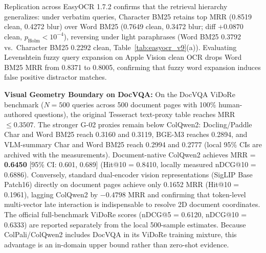 Replication across EasyOCR 1.7.2 \cite{jaidedai2020easyocr} confirms that the retrieval hierarchy generalizes: under verbatim queries, Character BM25 retains top MRR (0.8519 clean, 0.4272 blur) over Word BM25 (0.7649 clean, 0.3472 blur; diff $+0.0870$ clean, $p_{\text{Holm}} < 10^{-4}$), reversing under light paraphrases (Word BM25 0.3792 vs.\ Character BM25 0.2292 clean, Table~\ref{tab:easyocr_v9}(a)). Evaluating Levenshtein fuzzy query expansion on Apple Vision clean OCR drops Word BM25 MRR from 0.8371 to 0.8005, confirming that fuzzy word expansion induces false positive distractor matches.

\textbf{Visual Geometry Boundary on DocVQA:} On the DocVQA ViDoRe benchmark ($N=500$ queries across 500 document pages with 100\% human-authored questions), the original Tesseract text-proxy table reaches MRR $\le 0.3507$. The stronger G-02 proxies remain below ColQwen2: Docling/Paddle Char and Word BM25 reach 0.3160 and 0.3119, BGE-M3 reaches 0.2894, and VLM-summary Char and Word BM25 reach 0.2994 and 0.2777 (local 95\% CIs are archived with the measurements). Document-native ColQwen2 \cite{faysse2024colqwen2} achieves MRR = \textbf{0.6450} [95\% CI: 0.601, 0.689] (Hit@10 = 0.8410, locally measured nDCG@10 = 0.6886). Conversely, standard dual-encoder vision representations (SigLIP Base Patch16) directly on document pages achieve only 0.1652 MRR (Hit@10 = 0.1961), lagging ColQwen2 by $-0.4798$ MRR and confirming that token-level multi-vector late interaction is indispensable to resolve 2D document coordinates. The official full-benchmark ViDoRe scores (nDCG@5 = 0.6120, nDCG@10 = 0.6333) are reported separately from the local 500-sample estimates. Because ColPali/ColQwen2 includes DocVQA in its ViDoRe training mixture, this advantage is an in-domain upper bound rather than zero-shot evidence.

